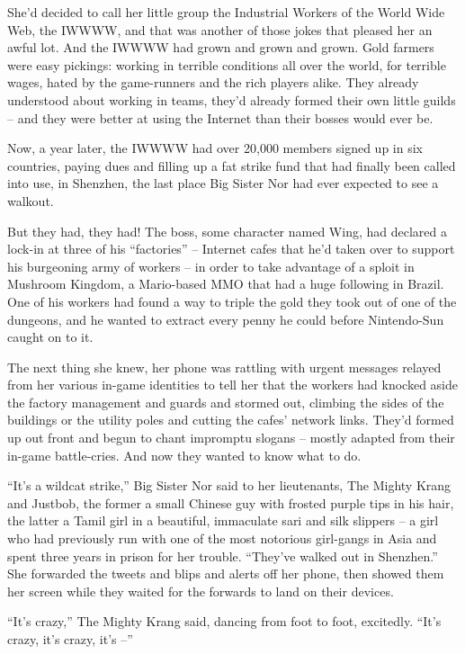 She'd decided to call her little group the Industrial Workers of
the World Wide Web, the IWWWW, and that was another of those jokes
that pleased her an awful lot. And the IWWWW had grown and grown
and grown. Gold farmers were easy pickings: working in terrible
conditions all over the world, for terrible wages, hated by the
game-runners and the rich players alike. They already understood
about working in teams, they'd already formed their own little
guilds -- and they were better at using the Internet than their
bosses would ever be.

Now, a year later, the IWWWW had over 20,000 members signed up in
six countries, paying dues and filling up a fat strike fund that
had finally been called into use, in Shenzhen, the last place Big
Sister Nor had ever expected to see a walkout.

But they had, they had! The boss, some character named Wing, had
declared a lock-in at three of his ``factories'' -- Internet cafes
that he'd taken over to support his burgeoning army of workers --
in order to take advantage of a sploit in Mushroom Kingdom, a
Mario-based MMO that had a huge following in Brazil. One of his
workers had found a way to triple the gold they took out of one of
the dungeons, and he wanted to extract every penny he could before
Nintendo-Sun caught on to it.

The next thing she knew, her phone was rattling with urgent
messages relayed from her various in-game identities to tell her
that the workers had knocked aside the factory management and
guards and stormed out, climbing the sides of the buildings or the
utility poles and cutting the cafes' network links. They'd formed
up out front and begun to chant impromptu slogans -- mostly adapted
from their in-game battle-cries. And now they wanted to know what
to do.

``It's a wildcat strike,'' Big Sister Nor said to her lieutenants,
The Mighty Krang and Justbob, the former a small Chinese guy with
frosted purple tips in his hair, the latter a Tamil girl in a
beautiful, immaculate sari and silk slippers -- a girl who had
previously run with one of the most notorious girl-gangs in Asia
and spent three years in prison for her trouble. ``They've walked
out in Shenzhen.'' She forwarded the tweets and blips and alerts off
her phone, then showed them her screen while they waited for the
forwards to land on their devices.

``It's crazy,'' The Mighty Krang said, dancing from foot to foot,
excitedly. ``It's crazy, it's crazy, it's --''


